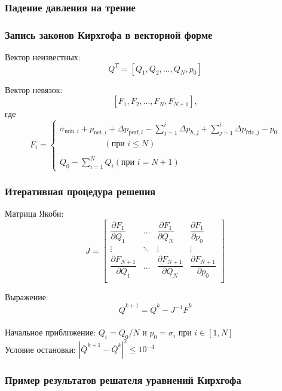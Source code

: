 \documentclass{beamer}
\begin{document}
\begin{frame}
\frametitle{Падение давления на трение}

\end{frame}


\begin{frame}
\frametitle{Запись законов Кирхгофа в векторной форме}

Вектор неизвестных:
$$Q^T=\left[Q_1,Q_2,...,Q_N,p_0\right]$$

Вектор невязок:
$$\left[F_1,F_2,...,F_N,F_{N+1}\right],$$
где
$$
F_i=
\begin{cases}
\sigma_{\text{min},i}+p_{\text{net},i}+\Delta p_{\text{perf},i}-\sum\limits_{j=1}^{i}{\Delta p_{h,j}}+\sum\limits_{j=1}^{i}{\Delta p_{\text{fric},j}}-p_0\\\,\,\,\,\,\,\,\,\,\,\,\,\,\,\,\,\,\,\,\,\,\,\,\,\,\,\,\,\,\,\,\,\left(\text{при }i\leqslant N\right)\\\ \\
Q_0-\sum\limits_{i=1}^{N}{Q_i}\left(\text{при }i=N+1\right)
\end{cases}
$$

\end{frame}


\begin{frame}
\frametitle{Итеративная процедура решения}
Матрица Якоби:
$$J = \begin{bmatrix}
	\dfrac{\partial F_1}{\partial Q_1} & \dots & \dfrac{\partial F_1}{\partial Q_N} & \dfrac{\partial F_1}{\partial p_0} \\
	\vdots & \ddots & \vdots & \vdots \\
	\dfrac{\partial F_{N+1}}{\partial Q_1} & \dots & \dfrac{\partial F_{N+1}}{\partial Q_N} & \dfrac{\partial F_{N+1}}{\partial p_0} \\
	\end{bmatrix}
$$

Выражение:
$$\overline{Q}^{k+1}=\overline{Q}^k-J^{-1}\overline{F}^k$$
\ \\

Начальное приближение:
$Q_i=Q_0/N\text{ и }p_0=\sigma_i\text{ при } i\in\left[1,N\right]$
\ \\

Условие остановки:
$\left|\overline{Q}^{k+1}-\overline{Q}^k\right|^2\leqslant10^{-4}$

\end{frame}


\begin{frame}
\frametitle{Пример результатов решателя уравнений Кирхгофа}

\end{frame}
\end{document}

